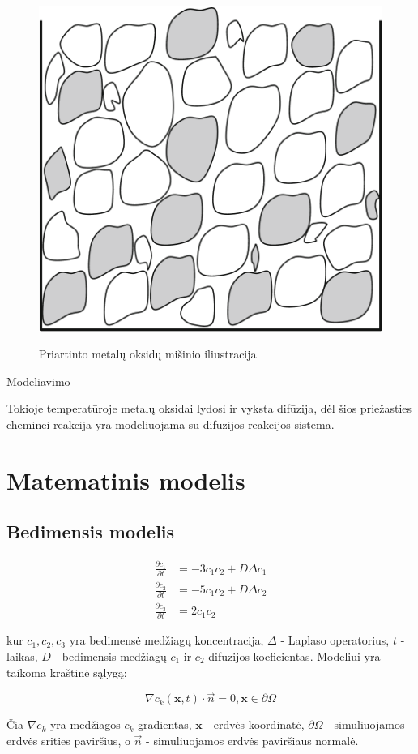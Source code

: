 \documentclass{VUMIFInfKursinis}
\begin{document}
\begin{figure}[h]
  \centering
  \includegraphics[width=0.25\linewidth]{assets/metal_oxides_mixture.png}
  \label{fig:metal-oxides-mixuter}
  \caption{Priartinto metalų oksidų mišinio iliustracija \cite{}}
\end{figure}

Modeliavimo 

Tokioje temperatūroje metalų oksidai lydosi ir vyksta difūzija, dėl šios priežasties cheminei reakcija yra modeliuojama su difūzijos-reakcijos sistema.

\section{Matematinis modelis}

\subsection{Bedimensis modelis}

\begin{subequations} \label{nodim}
    \begin{align}
    \frac{\partial c_1}{\partial t}&=-3c_1c_2+D\Delta c_1\\
    \frac{\partial c_2}{\partial t}&=-5c_1c_2+D\Delta c_2\\
    \frac{\partial c_3}{\partial t}&=2c_1c_2
    \end{align}
\end{subequations}

kur $c_1,c_2,c_3$ yra bedimensė medžiagų koncentracija, 
$\Delta$ - Laplaso operatorius, $t$ - laikas, 
$D$ - bedimensis medžiagų $c_1$ ir $c_2$ difuzijos koeficientas. Modeliui yra taikoma kraštinė sąlygą:

\begin{equation} \label{general-boundary-cond}
  \nabla c_k(\textbf{x}, t)\cdot\vec{n}=0, \textbf{x}\in\partial\Omega
\end{equation}

Čia $\nabla c_k$ yra medžiagos $c_k$ gradientas, $\textbf{x}$ - erdvės koordinatė, $\partial\Omega$ - simuliuojamos erdvės srities paviršius, o $\vec{n}$ - simuliuojamos erdvės paviršiaus normalė.
\end{document}
